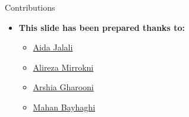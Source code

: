 \documentclass[serif, aspectratio=169]{beamer}
\begin{document}






\begin{frame}{Contributions}
\begin{itemize}
\item \textbf{This slide has been prepared thanks to:}
\begin{itemize}
    \setlength{\itemsep}{10pt} %
    \item \href{https://github.com/AidaJalali}{Aida Jalali}
    \item \href{https://github.com/alirezamirrokni}{Alireza Mirrokni}
    \item \href{https://silentdrift.github.io/}{Arshia Gharooni}
    \item \href{https://github.com/Mahan-Bayhaghi}{Mahan Bayhaghi}


\end{itemize}
\end{itemize}

\end{frame}

\begin{frame}[allowframebreaks]
    
    
    \nocite{*}
\end{frame}
\end{document}
